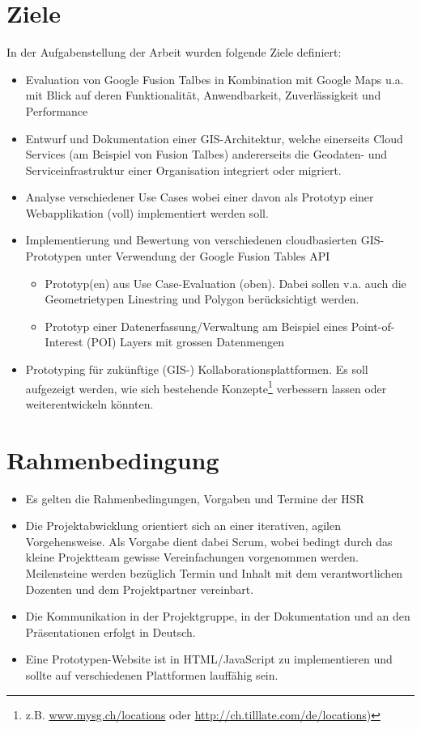 \section{Ziele}
In der Aufgabenstellung der Arbeit wurden folgende Ziele definiert:
\begin{itemize}
\item Evaluation von Google Fusion Talbes in Kombination mit Google Maps u.a. mit Blick auf deren Funktionalität, Anwendbarkeit, Zuverlässigkeit und Performance
\item Entwurf und Dokumentation einer GIS-Architektur, welche einerseits Cloud Services (am Beispiel von Fusion Talbes) andererseits die Geodaten- und Serviceinfrastruktur einer Organisation integriert oder migriert.
\item Analyse verschiedener Use Cases wobei einer davon als Prototyp einer Webapplikation (voll) implementiert werden soll. 
\item Implementierung und Bewertung von verschiedenen cloudbasierten GIS-Prototypen unter Verwendung der Google Fusion Tables API
\begin{itemize}
	\item Prototyp(en) aus Use Case-Evaluation (oben). Dabei sollen v.a. auch die Geometrietypen Linestring und Polygon berücksichtigt werden.
	\item Prototyp einer Datenerfassung/Verwaltung am Beispiel eines Point-of-Interest (POI) Layers mit grossen Datenmengen
\end{itemize}
\item Prototyping für zukünftige (GIS-) Kollaborationsplattformen. Es soll aufgezeigt werden, wie sich bestehende Konzepte\footnote{z.B. \url{www.mysg.ch/locations} oder \url{http://ch.tilllate.com/de/locations})} verbessern lassen oder weiterentwickeln könnten.
\end{itemize}

\section{Rahmenbedingung}
\begin{itemize}
\item Es gelten die Rahmenbedingungen, Vorgaben und Termine der HSR
\item Die Projektabwicklung orientiert sich an einer iterativen, agilen Vorgehensweise. Als Vorgabe dient dabei Scrum, wobei bedingt durch das kleine Projektteam gewisse Vereinfachungen vorgenommen werden. Meilensteine werden bezüglich Termin und Inhalt mit dem verantwortlichen Dozenten und dem Projektpartner vereinbart.
\item Die Kommunikation in der Projektgruppe, in der Dokumentation und an den Präsentationen erfolgt in Deutsch.
\item Eine Prototypen-Website ist in HTML/JavaScript zu implementieren und sollte auf verschiedenen Plattformen lauffähig sein.
\end{itemize}


